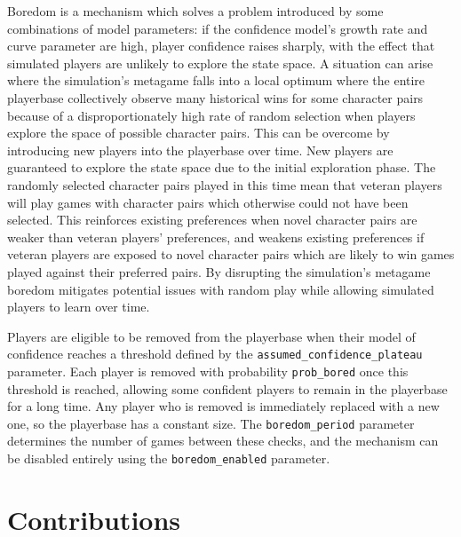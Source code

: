 Boredom is a mechanism which solves a problem introduced by some combinations of
model parameters: if the confidence model's growth rate and curve parameter are
high, player confidence raises sharply, with the effect that simulated players
are unlikely to explore the state space. A situation can arise where the
simulation's metagame falls into a local optimum where the entire playerbase
collectively observe many historical wins for some character pairs because of a
disproportionately high rate of random selection when players explore the space
of possible character pairs. This can be overcome by introducing new players
into the playerbase over time. New players are guaranteed to explore the state
space due to the initial exploration phase. The randomly selected character
pairs played in this time mean that veteran players will play games with
character pairs which otherwise could not have been selected. This reinforces
existing preferences when novel character pairs are weaker than veteran players'
preferences, and weakens existing preferences if veteran players are exposed to
novel character pairs which are likely to win games played against their
preferred pairs. By disrupting the simulation's metagame boredom mitigates
potential issues with random play while allowing simulated players to learn over
time.

Players are eligible to be removed from the playerbase when their model of
confidence reaches a threshold defined by the
\lstinline{assumed_confidence_plateau} parameter. Each player is removed with
probability \lstinline{prob_bored} once this threshold is reached, allowing some
confident players to remain in the playerbase for a long time. Any player who is
removed is immediately replaced with a new one, so the playerbase has a constant
size. The \lstinline{boredom_period} parameter determines the number of games
between these checks, and the mechanism can be disabled entirely using the
\lstinline{boredom_enabled} parameter.




\section{Contributions}





